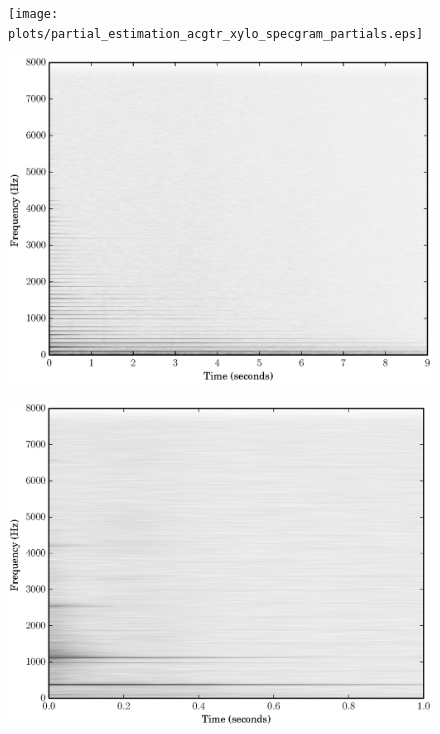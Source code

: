 \begin{figure}[!t]
    \centering
    \texttt{[image: plots/partial\_estimation\_acgtr\_xylo\_specgram\_partials.eps]}
    \CaptionWithTitle{%
    }{\label{plot:acgtra3xylofs4partials}}
\end{figure}

\begin{figure}[!t]
    \centering
    \includegraphics[width=\figwidthscale\textwidth]{plots/ac_gtr_orig_spec.eps}
    \CaptionWithTitle{%
    }{\label{plot:acgtra3specgram}}
\end{figure}

\begin{figure}[!t]
    \centering
    \includegraphics[width=\figwidthscale\textwidth]{plots/xylo_orig_spec.eps}
    \CaptionWithTitle{%
    }{\label{plot:xylofs4specgram}}
\end{figure}


